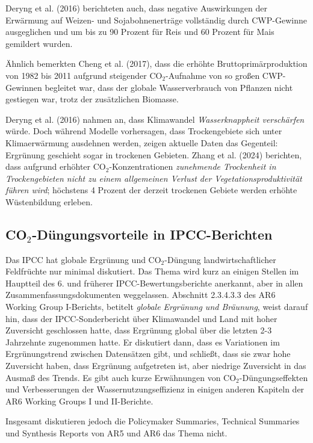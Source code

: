 \documentclass[12pt,paper=a4,DIV=12,parskip=never,chapterprefix=false,headings=standardclasses]{scrreprt}
\begin{document}
Deryng et al. (2016) berichteten auch, dass negative Auswirkungen der Erwärmung auf Weizen- und Sojabohnenerträge vollständig durch CWP-Gewinne ausgeglichen und um bis zu 90 Prozent für Reis und 60 Prozent für Mais gemildert wurden.

Ähnlich bemerkten Cheng et al. (2017), dass die erhöhte Bruttoprimärproduktion von 1982 bis 2011 aufgrund steigender CO$_2$-Aufnahme von so großen CWP-Gewinnen begleitet war, dass der globale Wasserverbrauch von Pflanzen nicht gestiegen war, trotz der zusätzlichen Biomasse.

Deryng et al. (2016) nahmen an, dass Klimawandel \emph{Wasserknappheit verschärfen} würde. Doch während Modelle vorhersagen, dass Trockengebiete sich unter Klimaerwärmung ausdehnen werden, zeigen aktuelle Daten das Gegenteil: Ergrünung geschieht sogar in trockenen Gebieten. Zhang et al. (2024) berichten, dass aufgrund erhöhter CO$_2$-Konzentrationen \emph{zunehmende Trockenheit in Trockengebieten nicht zu einem allgemeinen Verlust der Vegetationsproduktivität führen wird}; höchstens 4 Prozent der derzeit trockenen Gebiete werden erhöhte Wüstenbildung erleben.

\subsection{CO$_2$-Düngungsvorteile in IPCC-Berichten}

Das IPCC hat globale Ergrünung und CO$_2$-Düngung landwirtschaftlicher Feldfrüchte nur minimal diskutiert. Das Thema wird kurz an einigen Stellen im Hauptteil des 6. und früherer IPCC-Bewertungsberichte anerkannt, aber in allen Zusammenfassungsdokumenten weggelassen. Abschnitt 2.3.4.3.3 des AR6 Working Group I-Berichts, betitelt \emph{globale Ergrünung und Bräunung}, weist darauf hin, dass der IPCC-Sonderbericht über Klimawandel und Land mit hoher Zuversicht geschlossen hatte, dass Ergrünung global über die letzten 2-3 Jahrzehnte zugenommen hatte. Er diskutiert dann, dass es Variationen im Ergrünungstrend zwischen Datensätzen gibt, und schließt, dass sie zwar hohe Zuversicht haben, dass Ergrünung aufgetreten ist, aber niedrige Zuversicht in das Ausmaß des Trends. Es gibt auch kurze Erwähnungen von CO$_2$-Düngungseffekten und Verbesserungen der Wassernutzungseffizienz in einigen anderen Kapiteln der AR6 Working Groups I und II-Berichte.

Insgesamt diskutieren jedoch die Policymaker Summaries, Technical Summaries und Synthesis Reports von AR5 und AR6 das Thema nicht.
\end{document}

